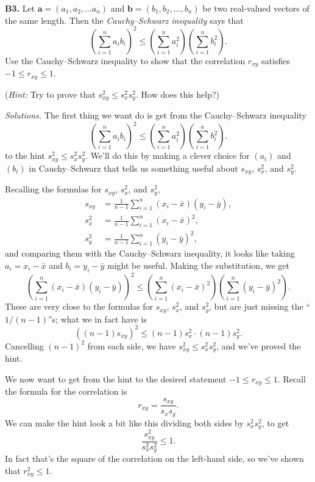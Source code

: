 \documentclass[
  a4paper,
]{book}
\theoremstyle{definition}
\theoremstyle{definition}
\theoremstyle{definition}
\theoremstyle{definition}
\theoremstyle{remark}
\begin{document}
\textbf{B3.} Let \(\mathbf a = (a_1, a_2, \dots a_n)\) and \(\mathbf b = (b_1, b_2, \dots, b_n)\) be two real-valued vectors of the same length. Then the \emph{Cauchy--Schwarz inequality} says that
\[ \left( \sum_{i=1}^n a_i b_i \right)^2 \leq \left( \sum_{i=1}^n a_i^2 \right) \left(\sum_{i=1}^n b_i^2 \right) . \]
Use the Cauchy--Schwarz inequality to show that the correlation \(r_{xy}\) satisfies \(-1 \leq r_{xy} \leq 1\).

(\emph{Hint:} Try to prove that \(s_{xy}^2 \leq s_x^2 s_y^2\). How does this help?)

\begin{myanswers}
\emph{Solutions.}
The first thing we want do is get from the Cauchy--Schwarz inequality
\[ \left( \sum_{i=1}^n a_i b_i \right)^2 \leq \left( \sum_{i=1}^n a_i^2 \right) \left(\sum_{i=1}^n b_i^2 \right) . \]
to the hint \(s_{xy}^2 \leq s_x^2 s_y^2\). We'll do this by making a clever choice for \((a_i)\) and \((b_i)\) in Cauchy--Schwarz that tells us something useful about \(s_{xy}\), \(s_x^2\), and \(s_y^2\).

Recalling the formulas for \(s_{xy}\), \(s_x^2\), and \(s_y^2\),
\begin{align*}
s_{xy} &= \frac{1}{n-1} \sum_{i=1}^n (x_i - \bar x)(y_i - \bar y) ,\\
s_{x}^2 &= \frac{1}{n-1} \sum_{i=1}^n (x_i - \bar x)^2 ,\\
s_{y}^2 &= \frac{1}{n-1} \sum_{i=1}^n (y_i - \bar y)^2 ,
\end{align*}
and comparing them with the Cauchy--Schwarz inequality, it looks like taking \(a_i = x_i - \bar x\) and \(b_i = y_i - \bar y\) might be useful. Making the substitution, we get
\[ \left( \sum_{i=1}^n (x_i - \bar x)(y_i - \bar y) \right)^2 \leq \left( \sum_{i=1}^n (x_i - \bar x)^2 \right) \left(\sum_{i=1}^n (y_i - \bar y)^2 \right) . \]
These are very close to the formulas for \(s_{xy}\), \(s_x^2\), and \(s_y^2\), but are just missing the ``\(1/(n-1)\)''s; what we in fact have is
\[ \left( (n-1) s_{xy} \right)^2 \leq (n-1)s_x^2 \cdot (n-1) s_y^2 .\]
Cancelling \((n-1)^2\) from each side, we have \(s_{xy}^2 \leq s_x^2 s_y^2\), and we've proved the hint.

We now want to get from the hint to the desired statement \(-1 \leq r_{xy} \leq 1\). Recall the formula for the correlation is
\[ r_{xy} = \frac{s_{xy}}{s_xs_y} . \]
We can make the hint look a bit like this dividing both sides by \(s_x^2 s_y^2\), to get
\[\frac{s_{xy}^2}{s_x^2 s_y^2} \leq 1.   \]
In fact that's the square of the correlation on the left-hand side, so we've shown that \(r_{xy}^2 \leq 1\).


\end{myanswers}
\end{document}
